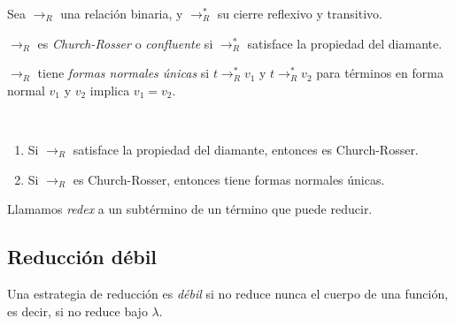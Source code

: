 \documentclass[twoside,a4paper,12pt]{article}
\let\tempone\itemize
\let\temptwo\enditemize
\renewenvironment{itemize}{\tempone\addtolength{\itemsep}{-0.4\baselineskip}}{\temptwo}
\theoremstyle{definition}
\theoremstyle{remark}
\begin{document}
\begin{definicion}{3.4}
  Sea $\to_R$ una relación binaria, y $\to^*_R$ su cierre reflexivo y transitivo.
  \begin{itemize}
  \item
  \item $\to_R$ es \emph{Church-Rosser} o \emph{confluente} si $\to^*_R$
    satisface la propiedad del diamante.
  \item $\to_R$ tiene \emph{formas normales únicas} si $t\to^*_R v_1$ y
    $t\to^*_R v_2$ para términos en forma normal $v_1$ y $v_2$ implica
    $v_1=v_2$.
  \end{itemize}
\end{definicion}

\begin{lema}{3.5}
  ~
  \begin{enumerate}
  \item Si $\to_R$ satisface la propiedad del diamante, entonces es
    Church-Rosser.
  \item Si $\to_R$ es Church-Rosser, entonces tiene formas normales únicas.
  \end{enumerate}
\end{lema}

\begin{definicion}{3.8}
  Llamamos \emph{redex} a un subtérmino de un término que puede reducir.
\end{definicion}

\subsection*{Reducción débil}

\begin{definicion}{3.9}
  Una estrategia de reducción es \emph{débil} si no reduce nunca el cuerpo de
  una función, es decir, si no reduce bajo $\lambda$.
\end{definicion}
\end{document}
